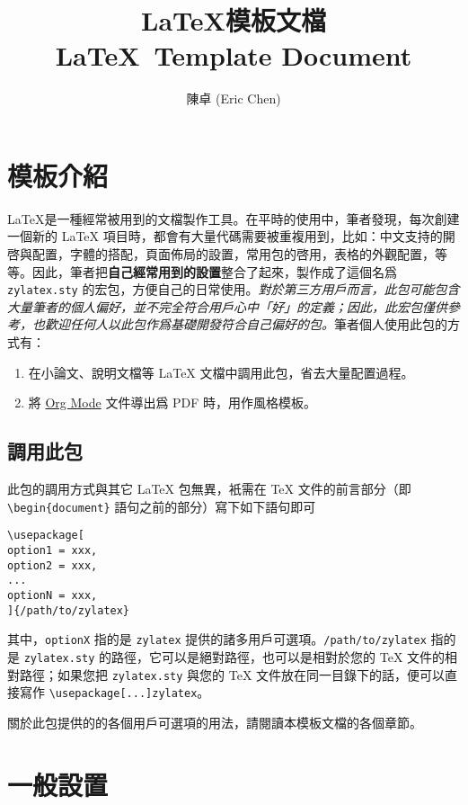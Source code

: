 \documentclass[
oneside,
12pt,
]{book}
\title{
  \Huge \LaTeX 模板文檔 \\
  \Large \LaTeX\ Template Document
}
\author{
  陳卓 (Eric Chen)
}
\date{\DTMtoday}
\begin{document}
\maketitle

\tableofcontents

\chapter{模板介紹}

\LaTeX 是一種經常被用到的文檔製作工具。在平時的使用中，筆者發現，每次創建一個新的 LaTeX 項目時，都會有大量代碼需要被重複用到，比如：中文支持的開啓與配置，字體的搭配，頁面佈局的設置，常用包的啓用，表格的外觀配置，等等。因此，筆者把\textbf{自己經常用到的設置}整合了起來，製作成了這個名爲 \texttt{zylatex.sty} 的宏包，方便自己的日常使用。\textit{對於第三方用戶而言，此包可能包含大量筆者的個人偏好，並不完全符合用戶心中「好」的定義；因此，此宏包僅供參考，也歡迎任何人以此包作爲基礎開發符合自己偏好的包。}筆者個人使用此包的方式有：

\begin{enumerate}
\item 在小論文、說明文檔等 LaTeX 文檔中調用此包，省去大量配置過程。
\item 將 \href{https://orgmode.org/}{Org Mode} 文件導出爲 PDF 時，用作風格模板。
\end{enumerate}

\section{調用此包}

此包的調用方式與其它 LaTeX 包無異，衹需在 TeX 文件的前言部分（即 \texttt{\textbackslash begin\{document\}} 語句之前的部分）寫下如下語句即可

\begin{verbatim}
\usepackage[
option1 = xxx,
option2 = xxx,
...
optionN = xxx,
]{/path/to/zylatex}
\end{verbatim}

其中，\texttt{optionX} 指的是 \texttt{zylatex} 提供的諸多用戶可選項。\texttt{/path/to/zylatex} 指的是 \texttt{zylatex.sty} 的路徑，它可以是絕對路徑，也可以是相對於您的 TeX 文件的相對路徑；如果您把 \texttt{zylatex.sty} 與您的 TeX 文件放在同一目錄下的話，便可以直接寫作 \texttt{\textbackslash usepackage[...]{zylatex}}。

關於此包提供的的各個用戶可選項的用法，請閱讀本模板文檔的各個章節。

\chapter{一般設置}
\end{document}
